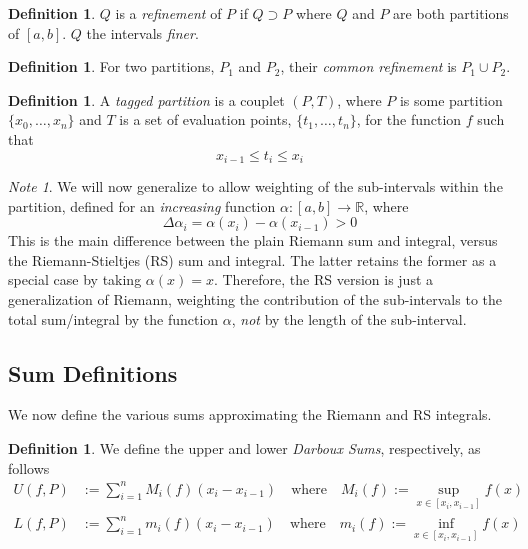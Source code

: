 \documentclass[12pt]{article}
\theoremstyle{plain}
\theoremstyle{definition}
\newtheorem{defn}[thm]{Definition}
\theoremstyle{remark}
\newtheorem*{note}{Note}
\begin{document}
\begin{defn} $Q$ is a \emph{refinement} of $P$ if $Q \supset P$ where $Q$ and $P$ are both partitions of $[a,b]$. $Q$ the intervals \emph{finer}.
\end{defn}

\begin{defn} For two partitions, $P_1$ and $P_2$, their \emph{common refinement} is $P_1 \cup P_2$.
\end{defn}

\begin{defn} A \emph{tagged partition} is a couplet $(P,T)$, where $P$ is some partition $\{x_0, \ldots, x_n\}$ and $T$ is a set of evaluation points, $\{t_1, \ldots, t_n\}$, for the function $f$  such that
    \[ x_{i-1} \leq t_i \leq x_i \]
\end{defn}

\begin{note} We will now generalize to allow weighting of the sub-intervals within the partition, defined for an \emph{increasing} function $\alpha: [a,b] \rightarrow \mathbb{R}$, where 
    \[ \Delta \alpha_i = \alpha(x_i) - \alpha(x_{i-1}) > 0 \]
This is the main difference between the plain Riemann sum and integral, versus the Riemann-Stieltjes (RS) sum and integral.  The latter retains the former as a special case by taking $\alpha(x) = x$.  Therefore, the RS version is just a generalization of Riemann, weighting the contribution of the sub-intervals to the total sum/integral by the function $\alpha$, \emph{not} by the length of the sub-interval.
\end{note}

\subsection{Sum Definitions}

We now define the various sums approximating the Riemann and RS integrals.

\begin{defn} We define the upper and lower \emph{Darboux Sums}, respectively, as follows 
    \begin{align*}
        U(f,P) &:= \sum^n_{i=1} M_i(f)(x_i - x_{i-1}) 
            \quad\text{where} \quad 
            M_i(f) := \sup_{x \in [x_i, x_{i-1}]} f(x)\\
        L(f,P) &:= \sum^n_{i=1} m_i(f)(x_i - x_{i-1})
            \quad\text{where} \quad 
            m_i(f) := \inf_{x \in [x_i, x_{i-1}]} f(x) 
    \end{align*}
\end{defn}
\end{document}
